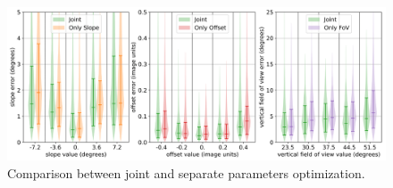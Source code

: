 \begin{figure}[!ht]
\centering
\includegraphics[width=\linewidth]{ablative/ablative.png}
\caption{Comparison between joint and separate parameters optimization.}
\end{figure}
